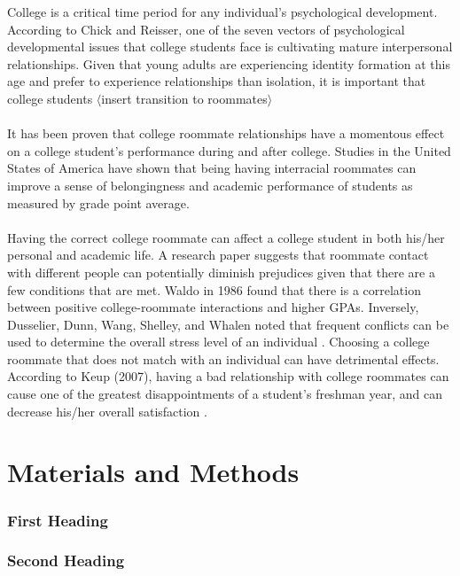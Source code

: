 \documentclass[journal]{./IEEE/IEEEtran}
\begin{document}
College is a critical time period for any individual’s psychological development\cite{erb}. According to Chick and Reisser, one of the seven vectors of psychological developmental issues that college students face is cultivating mature interpersonal relationships\cite{chickering}. Given that young adults are experiencing identity formation at this age and prefer to experience relationships than isolation, it is important that college students $\langle$insert transition to roommates$\rangle$
\\
\\
It has been proven that college roommate relationships have a momentous effect on a college student’s performance during and after college. Studies in the United States of America have shown that being having interracial roommates can improve a sense of belongingness and academic performance of students as measured by grade point average\cite{shook}.
\\
\\
Having the correct college roommate can affect a college student in both his/her personal and academic life. A research paper suggests that roommate contact with different people can potentially diminish prejudices given that there are a few conditions that are met. Waldo in 1986 found that there is a correlation between positive college-roommate interactions and higher GPAs. Inversely, Dusselier, Dunn, Wang, Shelley, and Whalen noted that frequent conflicts can be used to determine the overall stress level of an individual \cite{dusselier}. Choosing a college roommate that does not match with an individual can have detrimental effects. According to Keup (2007), having a bad relationship with college roommates can cause one of the greatest disappointments of a student’s freshman year, and can decrease his/her overall satisfaction \cite{keup}.


\section{Materials and Methods}

\subsubsection{First Heading}
\subsubsection{Second Heading}

\end{document}
